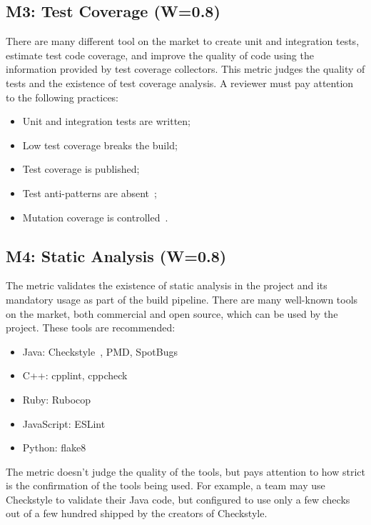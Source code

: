 \documentclass[12pt,oneside]{article}
\begin{document}
\subsection{M3: Test Coverage (W=0.8)}

There are many different tool on the market to create unit and integration tests,
estimate test code coverage, and improve the quality of code using
the information provided by test coverage collectors. This metric judges
the quality of tests and the existence of test coverage analysis. A reviewer
must pay attention to the following practices:

\begin{itemize}
  \item Unit and integration tests are written;
  \item Low test coverage breaks the build;
  \item Test coverage is published;
  \item Test anti-patterns are absent~\citep{yb-test-anti};
  \item Mutation coverage is controlled~\citep{andrews2006using}.
\end{itemize}

\subsection{M4: Static Analysis (W=0.8)}

The metric validates the existence of static analysis in the project
and its mandatory usage as part of the build pipeline.
There are many well-known tools on the market, both commercial and
open source, which can be used by the project. These tools are recommended:

\begin{itemize}
  \item Java: Checkstyle~\citep{checkstyle}, PMD, SpotBugs
  \item C++: cpplint, cppcheck
  \item Ruby: Rubocop~\citep{rubocop}
  \item JavaScript: ESLint
  \item Python: flake8
\end{itemize}

The metric doesn't judge the quality of the tools, but pays attention to how strict is the
confirmation of the tools being used. For example, a team may use Checkstyle
to validate their Java code, but configured to use only a few checks
out of a few hundred shipped by the creators of Checkstyle.
\end{document}
